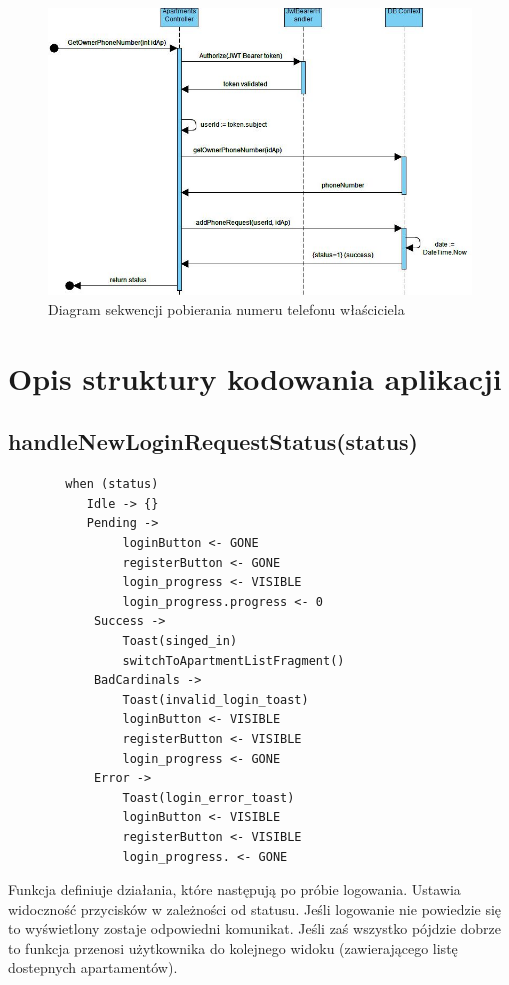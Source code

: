 \documentclass[polish, 11pt]{article}
\begin{document}
        \begin{figure}[H]
            \centering
            \includegraphics[width=\textwidth]{figures/getPhoneSeq.jpg}
            \caption{Diagram sekwencji pobierania numeru telefonu właściciela}
        \end{figure}
        
\section{Opis struktury kodowania aplikacji} %
    \subsection{handleNewLoginRequestStatus(status)}
        \begin{lstlisting}
        when (status) 
           Idle -> {}
           Pending -> 
                loginButton <- GONE
                registerButton <- GONE
                login_progress <- VISIBLE
                login_progress.progress <- 0
            Success -> 
                Toast(singed_in)
                switchToApartmentListFragment()
            BadCardinals -> 
                Toast(invalid_login_toast)
                loginButton <- VISIBLE
                registerButton <- VISIBLE
                login_progress <- GONE
            Error -> 
                Toast(login_error_toast)
                loginButton <- VISIBLE
                registerButton <- VISIBLE
                login_progress. <- GONE
         \end{lstlisting}
         Funkcja definiuje działania, które następują po próbie logowania. Ustawia widoczność przycisków w zależności od statusu. Jeśli logowanie nie powiedzie się to wyświetlony zostaje odpowiedni komunikat. Jeśli zaś wszystko pójdzie dobrze to funkcja przenosi użytkownika do kolejnego widoku (zawierającego listę dostepnych apartamentów).
\end{document}
